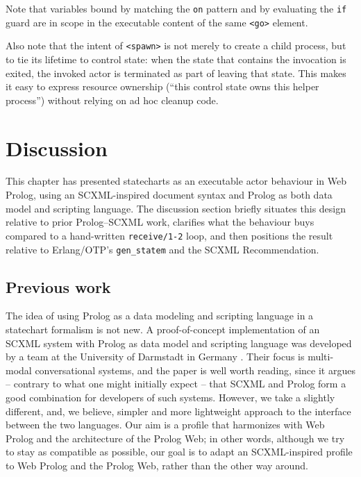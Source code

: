 \noindent Note that variables bound by matching the \texttt{on} pattern and by evaluating the \texttt{if} guard are in scope in the executable content of the same \texttt{<go>} element.

Also note that the intent of \texttt{<spawn>} is not merely to create a child process, but to tie its lifetime to control state: when the state that contains the invocation is exited, the invoked actor is terminated as part of leaving that state. This makes it easy to express resource ownership (``this control state owns this helper process'') without relying on ad hoc cleanup code.

\section{Discussion}\label{sec:discussion-statechart-genstatem-scxml}

This chapter has presented statecharts as an executable actor behaviour in Web Prolog, using an SCXML-inspired document syntax and Prolog as both data model and scripting language. The discussion section briefly situates this design relative to prior Prolog--SCXML work, clarifies what the behaviour buys compared to a hand-written \texttt{receive/1-2} loop, and then positions the result relative to Erlang/OTP's \texttt{gen\_statem} and the SCXML Recommendation.

\subsection{Previous work}\label{sec:previous-work-behavior}

\noindent The idea of using Prolog as a data modeling and scripting language in a statechart formalism is not new. A proof-of-concept implementation of an SCXML system with Prolog as data model and scripting language was developed by a team at the University of Darmstadt in Germany \cite{W13-4019}. Their focus is multi-modal conversational systems, and the paper is well worth reading, since it argues -- contrary to what one might initially expect -- that SCXML and Prolog form a good combination for developers of such systems. However, we take a slightly different, and, we believe, simpler and more lightweight approach to the interface between the two languages. Our aim is a profile that harmonizes with Web Prolog and the architecture of the Prolog Web; in other words, although we try to stay as compatible as possible, our goal is to adapt an SCXML-inspired profile to Web Prolog and the Prolog Web, rather than the other way around.

